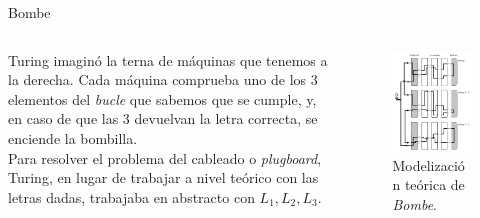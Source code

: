 \documentclass[aspectratio=169]{beamer}
\begin{document}
\begin{frame}{Bombe}
	\begin{columns}
		\begin{column}{0.5\linewidth}
			Turing imaginó la terna de máquinas que tenemos a la derecha. Cada máquina comprueba uno de los 3 elementos del \textit{bucle} que sabemos que se cumple, y, en caso de que las 3 devuelvan la letra correcta, se enciende la bombilla.\\

			Para resolver el problema del cableado o \textit{plugboard}, Turing, en lugar de trabajar a nivel teórico con las letras dadas, trabajaba en abstracto con $L_1, L_2, L_3$.
		\end{column}
		\begin{column}{0.35\linewidth}
			
			\begin{figure}
				\centering
				\includegraphics[width=0.9\linewidth]{pic/bucleDeTuring2}
				\caption{Modelización teórica de \textit{Bombe}.}
			\end{figure}
		\end{column}
	\end{columns}
\end{frame}
\end{document}
